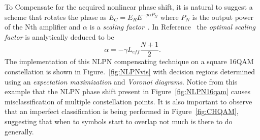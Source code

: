 To Compensate for the acquired nonlinear phase shift, it is natural to suggest a scheme that rotates the phase as $E_{C}=E_{R}E^{-j\alpha P_{N}}$ where  $P_{N}$ is the output power of the Nth amplifier and $\alpha$ is a \textit{scaling factor}~\cite{liu2002improving}. In Reference~\cite{NLPNDSP} the \textit{optimal scaling factor} is analytically deduced to be 
\begin{equation}
\alpha=-\gamma L_{eff}\frac{N+1}{2}.
\end{equation}
 The implementation of this NLPN compensating technique on a square 16QAM constellation is shown in Figure.~\ref{fig:NLPNvis} with decision regions determined using an \textit{expectation maximization} and \textit{Voronoi diagrams}. Notice from this example that the NLPN phase shift present in Figure~\ref{fig:NLPN16qam} causes misclassification of multiple constellation points. It is also important to observe that an imperfect classification is being performed in Figure~\ref{fig:CHQAM}, suggesting that when to symbols start to overlap not much is there to do generally. ~\\


